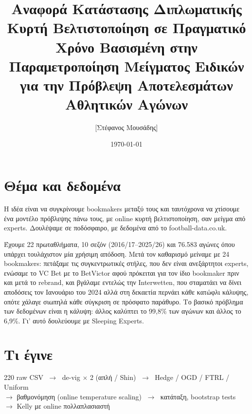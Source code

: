 \documentclass[11pt,a4paper]{article}
\title{\textbf{Αναφορά Κατάστασης Διπλωματικής}\\[8pt]
\large\normalfont Κυρτή Βελτιστοποίηση σε Πραγματικό Χρόνο Βασισμένη στην
Παραμετροποίηση Μείγματος Ειδικών\\ για την Πρόβλεψη Αποτελεσμάτων Αθλητικών Αγώνων}
\author{[Στέφανος Μουσάδης]}
\date{\today}
\renewcommand{\_}{\oldunderscore\allowbreak}
\begin{document}
\maketitle

\section{Θέμα και δεδομένα}

Η ιδέα είναι να συγκρίνουμε bookmakers μεταξύ τους και ταυτόχρονα να χτίσουμε ένα μοντέλο
πρόβλεψης πάνω τους, με online κυρτή βελτιστοποίηση, σαν μείγμα από experts. Δουλέψαμε σε
ποδόσφαιρο, με δεδομένα από το football-data.co.uk.

Έχουμε 22 πρωταθλήματα, 10 σεζόν (2016/17--2025/26) και 76.583 αγώνες όπου υπάρχει
τουλάχιστον μία χρήσιμη απόδοση. Μετά τον καθαρισμό μείναμε με 24 bookmakers: πετάξαμε τις
συγκεντρωτικές στήλες, που δεν είναι ανεξάρτητοι experts, ενώσαμε το VC Bet με το
BetVictor αφού πρόκειται για τον ίδιο bookmaker πριν και μετά το rebrand, και βγάλαμε
εντελώς την Interwetten, που σταματάει να δίνει αποδόσεις τον Ιανουάριο του 2024 αλλά στη
δεκαετία περνάει κάθε κατώφλι κάλυψης, οπότε χάλαγε σιωπηλά κάθε σύγκριση σε πρόσφατο
παράθυρο. Το βασικό πρόβλημα των δεδομένων είναι η κάλυψη: άλλος καλύπτει το 99,8\% των
αγώνων και άλλος το 6,9\%. Γι' αυτό δουλεύουμε με Sleeping Experts.

\section{Τι έγινε}

\begin{center}
\begin{minipage}{0.92\textwidth}
\ttfamily\small
220 raw CSV $\;\to\;$ de-vig $\times$ 2 (απλή / Shin) $\;\to\;$
Hedge / OGD / FTRL / Uniform\\
\hspace*{1em}$\to$ βαθμονόμηση (online temperature scaling)
$\;\to\;$ κατάταξη, bootstrap tests\\
\hspace*{1em}$\to$ Kelly με online πολλαπλασιαστή
\end{minipage}
\end{center}
\end{document}
